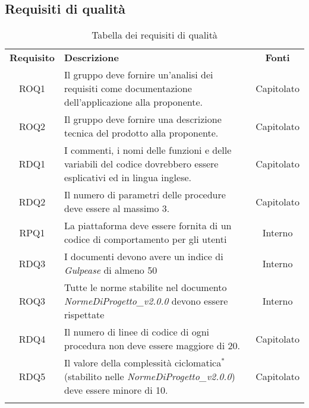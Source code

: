 \subsection{Requisiti di qualità}
\begin{longtable}{| c | p{10cm} | c |}
		\rowcolor{LightBlue}
		\color{white}\bfseries Requisito & \color{white}\bfseries Descrizione & \color{white}\bfseries Fonti\\[0.25cm]
		ROQ1 & Il gruppo deve fornire un'analisi dei requisiti come documentazione dell'applicazione alla proponente. & Capitolato \\
		ROQ2 & Il gruppo deve fornire una descrizione tecnica del prodotto alla proponente. & Capitolato \\ 
		RDQ1 & I commenti, i nomi delle funzioni e delle variabili del codice dovrebbero essere esplicativi ed in lingua inglese. & Capitolato \\ 
		RDQ2 & Il numero di parametri delle procedure deve essere al massimo 3. & Capitolato \\
		RPQ1 & La piattaforma deve essere fornita di un codice di comportamento per gli utenti & Interno\\
		RDQ3 & I documenti devono avere un indice di \textit{Gulpease} di almeno 50 & Interno\\
		ROQ3 & Tutte le norme stabilite nel documento \textit{NormeDiProgetto\_v2.0.0} devono essere rispettate & Interno\\
		RDQ4 & Il numero di linee di codice di ogni procedura non deve essere maggiore di 20. & Capitolato\\
		RDQ5 & Il valore della complessità ciclomatica$^*$ (stabilito nelle \textit{NormeDiProgetto\_v2.0.0}) deve essere minore di 10. & Capitolato\\
		\hline
		\caption{Tabella dei requisiti di qualità}
\end{longtable}